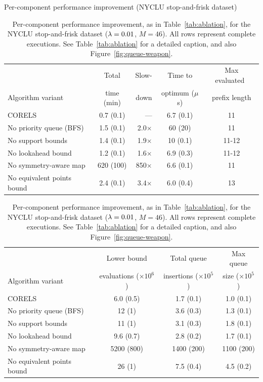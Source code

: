 \begin{table}[t!]
\begin{centering}
Per-component performance improvement (NYCLU stop-and-frisk dataset) \\
\end{centering}
\vspace{1mm}
\begin{tabular}{l | c  r | c | c}
& Total & Slow- & Time to & Max evaluated~ \\
Algorithm variant & time (min) & down & optimum ($\mu$s) & prefix length \\
\hline
CORELS & 0.7 (0.1) & --- & 6.7 (0.1) & 11 \\
No priority queue (BFS) & 1.5 (0.1) & 2.0$\times$ & 60 (20) & 11 \\
No support bounds & 1.4 (0.1) & 1.9$\times$ & 10 (0.1) & 11-12 \\
No lookahead bound & 1.2 (0.1) & 1.6$\times$ & 6.9 (0.3) & 11-12 \\
No symmetry-aware map & 620 (100) & 850$\times$ & 6.6 (0.1) & 11 \\
No equivalent points bound & 2.4 (0.1) & 3.4$\times$ & 6.0 (0.4) & 13 \\
\hline
\end{tabular}
\begin{tabular}{l | c | c | c}
\hline
 & Lower bound & Total queue &  Max queue \\
Algorithm variant & evaluations ($\times 10^6$) & insertions ($\times 10^5$) & size ($\times 10^5$) \\
\hline
CORELS & 6.0 (0.5) & 1.7 (0.1) & 1.0 (0.1) \\
No priority queue (BFS) & 12 (1) & 3.6 (0.3) & 1.3 (0.1) \\
No support bounds & 11 (1) & 3.1 (0.3) & 1.8 (0.1) \\
No lookahead bound & 9.6 (0.7) & 2.8 (0.2) & 1.7 (0.1) \\
No symmetry-aware map & 5200 (800) & 1400 (200) & 1100 (200) \\
No equivalent points bound & 26 (1) & 7.5 (0.4) & 4.5 (0.2) \\
\end{tabular}
\caption{Per-component performance improvement, as in Table~\ref{tab:ablation},
for the NYCLU stop-and-frisk dataset (${{\lambda} = 0.01}$, ${M = 46}$).
%
All rows represent complete executions.
%
See Table~\ref{tab:ablation} for a detailed caption,
and also Figure~\ref{fig:queue-weapon}.
}
\vspace{4mm}
\label{tab:ablation-weapon}
\end{table}

